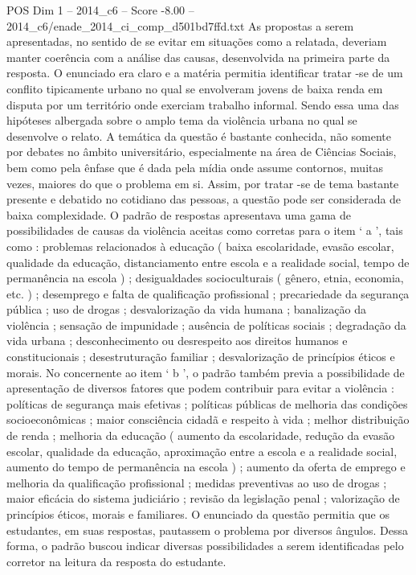 \begin{textsample}{POS Dim 1 – 2014\_c6 – Score -8.00 – 2014\_c6/enade\_2014\_ci\_comp\_d501bd7ffd.txt}
As propostas a serem apresentadas, no sentido de se evitar em situações como a relatada, deveriam manter coerência com a análise das causas, desenvolvida na primeira parte da resposta.
O enunciado era claro e a matéria permitia identificar tratar -se de um conflito tipicamente urbano no qual se envolveram jovens de baixa renda em disputa por um território onde exerciam trabalho informal.
Sendo essa uma das hipóteses albergada sobre o amplo tema da violência urbana no qual se desenvolve o relato.
A temática da questão é bastante conhecida, não somente por debates no âmbito universitário, especialmente na área de Ciências Sociais, bem como pela ênfase que é dada pela mídia onde assume contornos, muitas vezes, maiores do que o problema em si.
Assim, por tratar -se de tema bastante presente e debatido no cotidiano das pessoas, a questão pode ser considerada de baixa complexidade.
O padrão de respostas apresentava uma gama de possibilidades de causas da violência aceitas como corretas para o item ‘ a ’, tais como : problemas relacionados à educação ( baixa escolaridade, evasão escolar, qualidade da educação, distanciamento entre escola e a realidade social, tempo de permanência na escola ) ; desigualdades socioculturais ( gênero, etnia, economia, etc. ) ; desemprego e falta de qualificação profissional ; precariedade da segurança pública ; uso de drogas ; desvalorização da vida humana ; banalização da violência ; sensação de impunidade ; ausência de políticas sociais ; degradação da vida urbana ; desconhecimento ou desrespeito aos direitos humanos e constitucionais ; desestruturação familiar ; desvalorização de princípios éticos e morais.
No concernente ao item ‘ b ’, o padrão também previa a possibilidade de apresentação de diversos fatores que podem contribuir para evitar a violência : políticas de segurança mais efetivas ; políticas públicas de melhoria das condições socioeconômicas ; maior consciência cidadã e respeito à vida ; melhor distribuição de renda ; melhoria da educação ( aumento da escolaridade, redução da evasão escolar, qualidade da educação, aproximação entre a escola e a realidade social, aumento do tempo de permanência na escola ) ; aumento da oferta de emprego e melhoria da qualificação profissional ; medidas preventivas ao uso de drogas ; maior eficácia do sistema judiciário ; revisão da legislação penal ; valorização de princípios éticos, morais e familiares.
O enunciado da questão permitia que os estudantes, em suas respostas, pautassem o problema por diversos ângulos.
Dessa forma, o padrão buscou indicar diversas possibilidades a serem identificadas pelo corretor na leitura da resposta do estudante.

\end{textsample}
